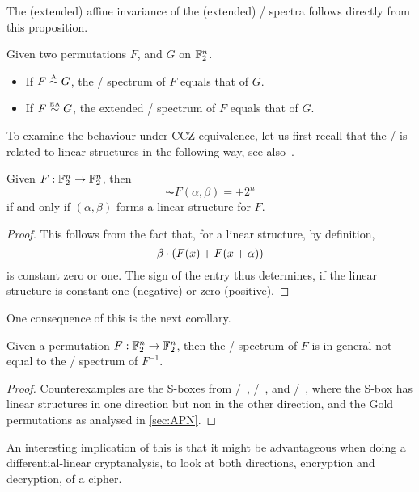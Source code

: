The (extended) affine invariance of the (extended) \ACT/ spectra follows directly from this proposition.
\begin{corollary}
    Given two permutations $F$, and $G$ on $\mathbb{F}_2^n$.
    \begin{itemize}
        \item If $F \stackrel{\text{\tiny A}}{\sim} G$, the \ACT/ spectrum of $F$ equals that of $G$.
        \item If $F \stackrel{\text{\tiny EA}}{\sim} G$, the extended \ACT/ spectrum of $F$ equals that of $G$.
    \end{itemize}
\end{corollary}

To examine the behaviour under CCZ equivalence, let us first recall that the \ACT/ is related to linear structures in the following way, see also~\cite{DCC:ZhaZheIma00,LIGHTSEC:MakTez14}.
\begin{lemma}\label{act:lem:ls}
    Given $F : \mathbb{F}_2^n \to \mathbb{F}_2^n$, then
    \begin{equation*}
        \AC{F}(\alpha, \beta) = \pm 2^{n}
    \end{equation*}
    if and only if $(\alpha, \beta)$ forms a linear structure for $F$.
\end{lemma}
\begin{proof}
    This follows from the fact that, for a linear structure, by definition,
    \begin{equation*}
        \beta \cdot (F(x) + F(x+\alpha))
    \end{equation*}
    is constant zero or one.
    The sign of the entry thus determines, if the linear structure is constant one (negative) or zero (positive).
\end{proof}

One consequence of this is the next corollary.
\begin{corollary}[Inversion]\label{cor:act:inversion}
    Given a permutation $F : \mathbb{F}_2^n \to \mathbb{F}_2^n$, then the \ACT/ spectrum of $F$ is in general not equal to the \ACT/ spectrum of $F^{-1}$.
\end{corollary}
\begin{proof}
    Counterexamples are the S-boxes from \safer/~\cite{FSE:Massey93}, /~\cite{FSE:SYYTIYTT01}, and \fides/~\cite{CHES:BBKMW13}, where the S-box has linear structures in one direction but non in the other direction, and the Gold permutations as analysed in \cref{sec:APN}.
\end{proof}
An interesting implication of this is that it might be advantageous when doing a differential-linear cryptanalysis, to look at both directions, encryption and decryption, of a cipher.

